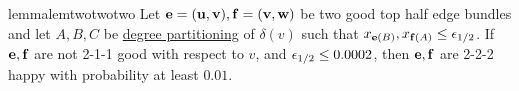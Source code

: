 %

%




\begin{restatable}{lemma}{lemtwotwotwo}
\label{lem:222}
	Let ${\bf e}={\bf (u,v)},{\bf f}={\bf (v,w)}$ be two good top half edge bundles and let $A,B,C$ be \hyperlink{tar:degreepartition}{degree partitioning} of $\delta(v)$ such that $x_{{\bf e}(B)},x_{{\bf f}(A)}\leq {\epsilon}_{1/2}$. 
If ${\bf e},{\bf f}$ are not 2-1-1 good with respect to $v$, and ${\epsilon}_{1/2}\leq 0.0002$, then ${\bf e},{\bf f}$ are 2-2-2 happy with probability at least $0.01$.
\end{restatable}

